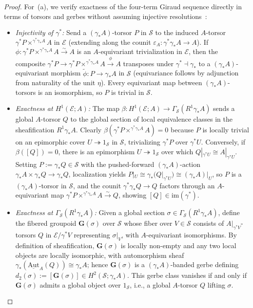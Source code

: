 \documentclass[10pt,twoside,openright]{book}
\theoremstyle{crmplain}
\theoremstyle{crmdef}
\theoremstyle{crmremark}
\begin{document}
\begin{proof}
For~(a), we verify exactness of the four-term Giraud sequence directly in terms of torsors and gerbes without assuming injective resolutions~\cite[Ch.~V, \S 3]{Giraud71}:
\begin{itemize}[leftmargin=1.5em]
  \item \emph{Injectivity of $\gamma^*$:} Send a $(\gamma_* A)$-torsor $P$ in $\mathcal{S}$ to the induced $A$-torsor $\gamma^* P \times^{\gamma^*\gamma_* A} A$ in $\mathcal{E}$ (extending along the counit $\varepsilon_A : \gamma^*\gamma_* A \to A$). If $\phi : \gamma^* P \times^{\gamma^*\gamma_* A} A \xrightarrow{\sim} A$ is an $A$-equivariant trivialization in $\mathcal{E}$, then the composite $\gamma^* P \to \gamma^* P \times^{\gamma^*\gamma_* A} A \xrightarrow{\phi} A$ transposes under $\gamma^* \dashv \gamma_*$ to a $(\gamma_* A)$-equivariant morphism $\tilde{\phi} : P \to \gamma_* A$ in $\mathcal{S}$ (equivariance follows by adjunction from naturality of the unit $\eta$). Every equivariant map between $(\gamma_* A)$-torsors is an isomorphism, so $P$ is trivial in $\mathcal{S}$.
  \item \emph{Exactness at $H^1(\mathcal{E}; A)$:} The map $\beta : H^1(\mathcal{E}; A) \to \Gamma_{\mathcal{S}}(R^1\gamma_* A)$ sends a global $A$-torsor $Q$ to the global section of local equivalence classes in the sheafification $R^1\gamma_* A$. Clearly $\beta(\gamma^* P \times^{\gamma^*\gamma_* A} A) = 0$ because $P$ is locally trivial on an epimorphic cover $U \twoheadrightarrow 1_{\mathcal{S}}$ in $\mathcal{S}$, trivializing $\gamma^* P$ over $\gamma^* U$. Conversely, if $\beta([Q]) = 0$, there is an epimorphism $U \twoheadrightarrow 1_{\mathcal{S}}$ over which $Q|_{\gamma^* U} \cong A|_{\gamma^* U}$. Setting $P := \gamma_* Q \in \mathcal{S}$ with the pushed-forward $(\gamma_* A)$-action $\gamma_* A \times \gamma_* Q \to \gamma_* Q$, localization yields $P|_U \cong \gamma_*(Q|_{\gamma^* U}) \cong (\gamma_* A)|_U$, so $P$ is a $(\gamma_* A)$-torsor in $\mathcal{S}$, and the counit $\gamma^* \gamma_* Q \to Q$ factors through an $A$-equivariant map $\gamma^* P \times^{\gamma^*\gamma_* A} A \xrightarrow{\sim} Q$, showing $[Q] \in \mathrm{im}(\gamma^*)$.
  \item \emph{Exactness at $\Gamma_{\mathcal{S}}(R^1\gamma_* A)$:} Given a global section $\sigma \in \Gamma_{\mathcal{S}}(R^1\gamma_* A)$, define the fibered groupoid $\mathbf{G}(\sigma)$ over $\mathcal{S}$ whose fiber over $V \in \mathcal{S}$ consists of $A|_{\gamma^* V}$-torsors $Q$ in $\mathcal{E}/\gamma^* V$ representing $\sigma|_V$, with $A$-equivariant isomorphisms. By definition of sheafification, $\mathbf{G}(\sigma)$ is locally non-empty and any two local objects are locally isomorphic, with automorphism sheaf $\gamma_*(\underline{\mathrm{Aut}}_A(Q)) \cong \gamma_* A$; hence $\mathbf{G}(\sigma)$ is a $(\gamma_* A)$-banded gerbe defining $d_2(\sigma) := [\mathbf{G}(\sigma)] \in H^2(\mathcal{S}; \gamma_* A)$. This gerbe class vanishes if and only if $\mathbf{G}(\sigma)$ admits a global object over $1_{\mathcal{S}}$, i.e., a global $A$-torsor $Q$ lifting $\sigma$.

\end{itemize}
\end{proof}
\end{document}
